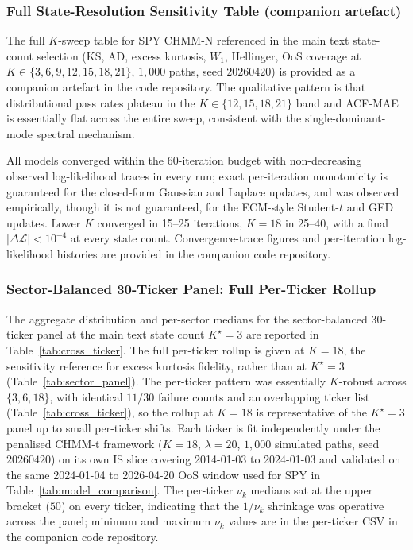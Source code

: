\subsubsection{Full State-Resolution Sensitivity Table (companion artefact)}
\label{sec:sensitivity_table}

The full $K$-sweep table for SPY CHMM-N referenced in the main text state-count selection (KS, AD, excess kurtosis, $W_1$, Hellinger, OoS coverage at $K \in \{3, 6, 9, 12, 15, 18, 21\}$, $1{,}000$ paths, seed $20260420$) is provided as a companion artefact in the code repository. The qualitative pattern is that distributional pass rates plateau in the $K \in \{12, 15, 18, 21\}$ band and ACF-MAE is essentially flat across the entire sweep, consistent with the single-dominant-mode spectral mechanism.

All models converged within the 60-iteration budget with non-decreasing observed log-likelihood traces in every run; exact per-iteration monotonicity is guaranteed for the closed-form Gaussian and Laplace updates, and was observed empirically, though it is not guaranteed, for the ECM-style Student-$t$ and GED updates. Lower $K$ converged in 15--25 iterations, $K = 18$ in 25--40, with a final $|\Delta \mathcal L| < 10^{-4}$ at every state count. Convergence-trace figures and per-iteration log-likelihood histories are provided in the companion code repository.

\subsubsection{Sector-Balanced 30-Ticker Panel: Full Per-Ticker Rollup}
\label{sec:cross_ticker_sector_panel}

The aggregate distribution and per-sector medians for the sector-balanced 30-ticker panel at the main text state count $K^\star = 3$ are reported in Table~\ref{tab:cross_ticker}.
The full per-ticker rollup is given at $K = 18$, the sensitivity reference for excess kurtosis fidelity, rather than at $K^\star = 3$ (Table~\ref{tab:sector_panel}). The per-ticker pattern was essentially $K$-robust across $\{3, 6, 18\}$, with identical $11/30$ failure counts and an overlapping ticker list (Table~\ref{tab:cross_ticker}), so the rollup at $K = 18$ is representative of the $K^\star = 3$ panel up to small per-ticker shifts. Each ticker is fit independently under the penalised CHMM-t framework ($K = 18$, $\lambda = 20$, $1{,}000$ simulated paths, seed $20260420$) on its own IS slice covering 2014-01-03 to 2024-01-03 and validated on the same 2024-01-04 to 2026-04-20 OoS window used for SPY in Table~\ref{tab:model_comparison}.
The per-ticker $\nu_k$ medians sat at the upper bracket ($50$) on every ticker, indicating that the $1/\nu_k$ shrinkage was operative across the panel; minimum and maximum $\nu_k$ values are in the per-ticker CSV in the companion code repository.

